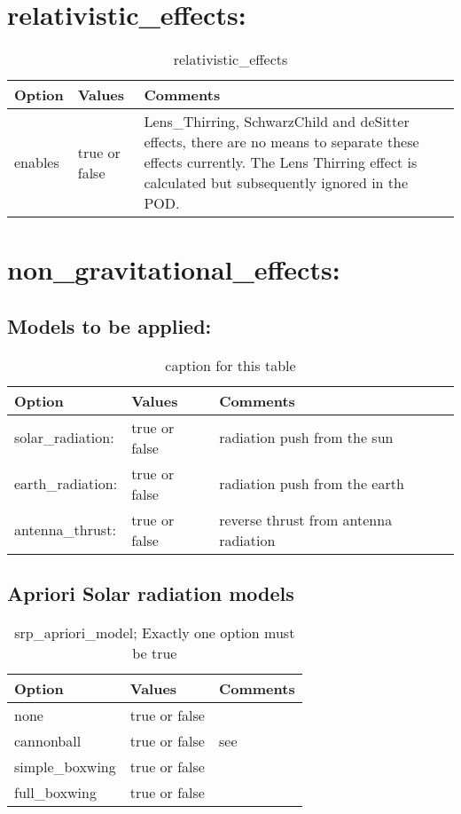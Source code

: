 %
\section{relativistic\_effects:}
\begin{table}[h!]
	\begin{tabular}{|p{2.5cm}|p{2.5cm}|p{5cm}|}
	\hline
	Option & Values & Comments \\
	\hline
	enables & true or false & Lens\_Thirring, SchwarzChild and deSitter effects, there are no means to separate these effects currently. The Lens Thirring effect is calculated but subsequently ignored in the POD.\\
	\hline
\end{tabular}
\caption{relativistic\_effects}
\label{table:label_name}
\end{table}
%
\section{non\_gravitational\_effects:}
\subsection{Models to be applied:}
\begin{table}[h!]
	\begin{tabular}{|p{2.5cm}|p{2.5cm}|p{5cm}|}
	\hline
	Option & Values & Comments \\
	\hline
    solar\_radiation: & true or false & radiation push from the sun \\
    earth\_radiation:  & true or false & radiation push from the earth \\
    antenna\_thrust:   & true or false & reverse thrust from antenna radiation \\
	\hline
\end{tabular}
\caption{caption for this table}
\label{table:label_name}
\end{table}
%
%
%
\subsection{Apriori Solar radiation models}   
\begin{table}[h!]
	\begin{tabular}{|p{2.5cm}|p{2.5cm}|p{5cm}|}
		\hline
		Option & Values & Comments \\
		\hline
		none & true or false & \\
		cannonball & true or false & see \nameref{sec:cannonball_srp}\\
		simple\_boxwing & true or false & \\
		full\_boxwing & true or false & \\
		\hline
	\end{tabular}
	\caption{srp\_apriori\_model; Exactly one option must be true}
	\label{table:label_name}
\end{table}
%
